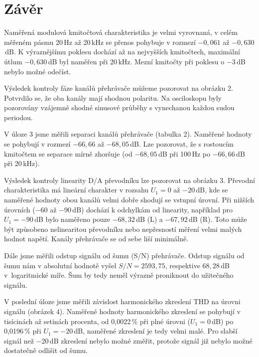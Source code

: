 \documentclass[a4paper, czech]{article}
\begin{document}
\section{Závěr}

Naměřená modulová kmitočtová charakteristika je velmi vyrovnaná, v celém měřeném pásmu 20\,Hz až 20\,kHz se přenos pohybuje v rozmezí $-0{,}061$ až $-0{,}630$\,dB.
K výraznějšímu poklesu dochází až na nejvyšších kmitočtech, maximální útlum $-0{,}630$\,dB byl naměřen při 20\,kHz.
Mezní kmitočty při poklesu o $-3$\,dB nebylo možné odečíst.

Výsledek kontroly fáze kanálů přehrávače můžeme pozorovat na obrázku 2.
Potvrdilo se, že oba kanály mají shodnou polaritu. Na osciloskopu byly pozorovány vzájemně shodné sinusové průběhy s vynechanou každou sudou periodou.

V úloze 3 jsme měřili separaci kanálů přehrávače (tabulka 2).
Naměřené hodnoty se pohybují v rozmezí $-66{,}66$ až $-68{,}05$\,dB.
Lze pozorovat, že s rostoucím kmitočtem se separace mírně zhoršuje (od $-68{,}05$\,dB při 100\,Hz po $-66{,}66$\,dB při 20\,kHz).

Výsledek kontroly linearity D/A převodníku lze pozorovat na obrázku 3.
Převodní charakteristika má lineární charakter v rozsahu $U_1 = 0$ až $-20$\,dB, kde se naměřené hodnoty obou kanálů velmi dobře shodují se vstupní úrovní.
Při nižších úrovních ($-60$ až $-90$\,dB) dochází k odchylkám od linearity, například pro $U_1 = -90$\,dB bylo naměřeno pouze $-68{,}32$\,dB (L) a $-67{,}92$\,dB (R).
Toto může být způsobeno nelinearitou převodníku nebo nepřesností měření velmi malých hodnot napětí.
Kanály přehrávače se od sebe liší minimálně.

Dále jsme měřili odstup signálu od šumu (S/N) přehrávače.
Odstup signálu od šumu nám v absolutní hodnotě vyšel $S/N = 2593{,}75$, respektive $68{,}28$\,dB v~logaritmické míře.
Šum by tedy neměl výrazně proniknout do užitečného signálu.

V poslední úloze jsme měřili závislost harmonického zkreslení THD na úrovni signálu (obrázek 4).
Naměřené hodnoty harmonického zkreslení se pohybují v tisícinách až setinách procenta, od 0,0022\,\% při plné úrovni ($U_1 = 0$\,dB) po 0,0196\,\% při $U_1 = -20$\,dB, naměřené zkreslení je tedy velmi malé.
Pro slabší signál než $-20$\,dB zkreslení nebylo možné změřit, protože signál již nebylo možné dostatečně odlišit od šumu.
\end{document}

